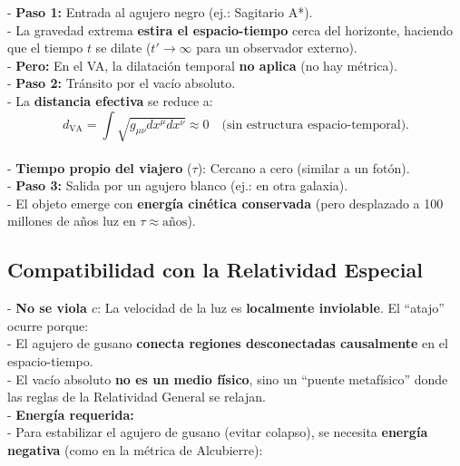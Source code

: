 \documentclass[a4paper]{article}
\theoremstyle{definition}
\theoremstyle{remark}
\numberwithin{equation}{section}
\begin{document}
	- \textbf{Paso 1:} Entrada al agujero negro (ej.: Sagitario A*).\\
	
	- La gravedad extrema \textbf{estira el espacio-tiempo} cerca del horizonte, haciendo que el tiempo \( t \) se dilate (\( t' \to \infty \) para un observador externo).\\
	
	- \textbf{Pero:} En el VA, la dilatación temporal \textbf{no aplica} (no hay métrica).\\
	
	- \textbf{Paso 2:} Tránsito por el vacío absoluto.\\
	
	- La \textbf{distancia efectiva} se reduce a:
	\[
	d_{\text{VA}} = \int \sqrt{g_{\mu\nu} dx^\mu dx^\nu} \approx 0 \quad \text{(sin estructura espacio-temporal)}.
	\] \\
	
	- \textbf{Tiempo propio del viajero} (\( \tau \)): Cercano a cero (similar a un fotón).\\
	
	- \textbf{Paso 3:} Salida por un agujero blanco (ej.: en otra galaxia).\\
	
	- El objeto emerge con \textbf{energía cinética conservada} (pero desplazado a 100 millones de años luz en \( \tau \approx \text{años} \)).
	
	\subsection{Compatibilidad con la Relatividad Especial}
	
	- \textbf{No se viola \( c \)}: La velocidad de la luz es \textbf{localmente inviolable}. El ``atajo'' ocurre porque:\\
	
	- El agujero de gusano \textbf{conecta regiones desconectadas causalmente} en el espacio-tiempo.\\
	
	- El vacío absoluto \textbf{no es un medio físico}, sino un ``puente metafísico'' donde las reglas de la Relatividad General se relajan.\\
	
	- \textbf{Energía requerida:}\\
	
	- Para estabilizar el agujero de gusano (evitar colapso), se necesita \textbf{energía negativa} (como en la métrica de Alcubierre):\\
	
\end{document}
